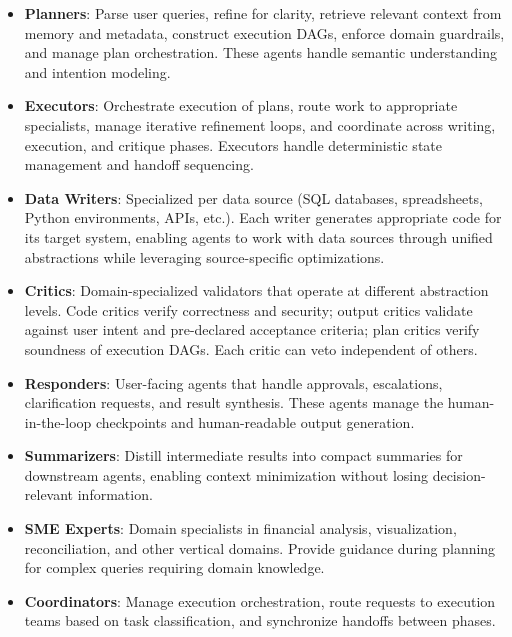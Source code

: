 \documentclass[sigconf]{acmart}
\begin{document}
\begin{itemize}
  \item \textbf{Planners}: Parse user queries, refine for clarity, retrieve relevant context from memory and metadata, construct execution DAGs, enforce domain guardrails, and manage plan orchestration. These agents handle semantic understanding and intention modeling.

  \item \textbf{Executors}: Orchestrate execution of plans, route work to appropriate specialists, manage iterative refinement loops, and coordinate across writing, execution, and critique phases. Executors handle deterministic state management and handoff sequencing.

  \item \textbf{Data Writers}: Specialized per data source (SQL databases, spreadsheets, Python environments, APIs, etc.). Each writer generates appropriate code for its target system, enabling agents to work with data sources through unified abstractions while leveraging source-specific optimizations.

  \item \textbf{Critics}: Domain-specialized validators that operate at different abstraction levels. Code critics verify correctness and security; output critics validate against user intent and pre-declared acceptance criteria; plan critics verify soundness of execution DAGs. Each critic can veto independent of others.

  \item \textbf{Responders}: User-facing agents that handle approvals, escalations, clarification requests, and result synthesis. These agents manage the human-in-the-loop checkpoints and human-readable output generation.

  \item \textbf{Summarizers}: Distill intermediate results into compact summaries for downstream agents, enabling context minimization without losing decision-relevant information.

  \item \textbf{SME Experts}: Domain specialists in financial analysis, visualization, reconciliation, and other vertical domains. Provide guidance during planning for complex queries requiring domain knowledge.

  \item \textbf{Coordinators}: Manage execution orchestration, route requests to execution teams based on task classification, and synchronize handoffs between phases.
\end{itemize}
\end{document}
